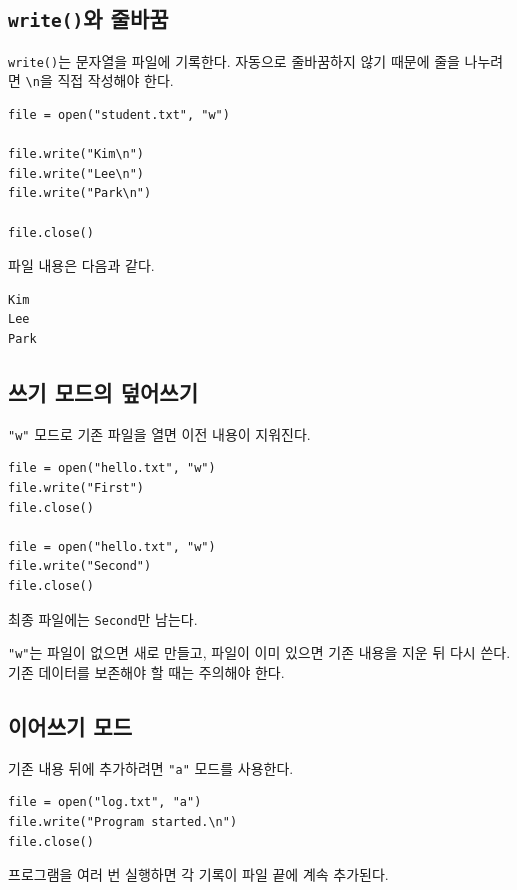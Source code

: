\documentclass[11pt,a4paper]{article}
\begin{document}
\subsection{\texttt{write()}와 줄바꿈}

\texttt{write()}는 문자열을 파일에 기록한다. 자동으로 줄바꿈하지 않기 때문에 줄을 나누려면 \texttt{\textbackslash n}을 직접 작성해야 한다.

\begin{lstlisting}
file = open("student.txt", "w")

file.write("Kim\n")
file.write("Lee\n")
file.write("Park\n")

file.close()
\end{lstlisting}

파일 내용은 다음과 같다.

\begin{verbatim}
Kim
Lee
Park
\end{verbatim}

\subsection{쓰기 모드의 덮어쓰기}

\texttt{"w"} 모드로 기존 파일을 열면 이전 내용이 지워진다.

\begin{lstlisting}
file = open("hello.txt", "w")
file.write("First")
file.close()

file = open("hello.txt", "w")
file.write("Second")
file.close()
\end{lstlisting}

최종 파일에는 \texttt{Second}만 남는다.

\begin{importantbox}
\texttt{"w"}는 파일이 없으면 새로 만들고, 파일이 이미 있으면 기존 내용을 지운 뒤 다시 쓴다. 기존 데이터를 보존해야 할 때는 주의해야 한다.
\end{importantbox}

\subsection{이어쓰기 모드}

기존 내용 뒤에 추가하려면 \texttt{"a"} 모드를 사용한다.

\begin{lstlisting}
file = open("log.txt", "a")
file.write("Program started.\n")
file.close()
\end{lstlisting}

프로그램을 여러 번 실행하면 각 기록이 파일 끝에 계속 추가된다.
\end{document}
